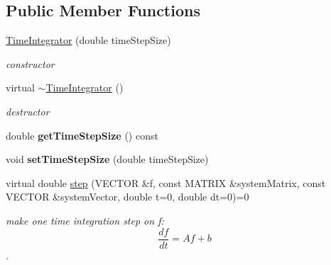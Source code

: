 \subsection*{Public Member Functions}
\begin{DoxyCompactItemize}
\item 
\hypertarget{classnatrium_1_1TimeIntegrator_a420ea9baabf0839bc8ecb5f5e02ce95b}{
\hyperlink{classnatrium_1_1TimeIntegrator_a420ea9baabf0839bc8ecb5f5e02ce95b}{TimeIntegrator} (double timeStepSize)}
\label{classnatrium_1_1TimeIntegrator_a420ea9baabf0839bc8ecb5f5e02ce95b}

\begin{DoxyCompactList}\small\item\em constructor \item\end{DoxyCompactList}\item 
\hypertarget{classnatrium_1_1TimeIntegrator_a8795d06c5322b72a5a2a1f30aa7a051d}{
virtual \hyperlink{classnatrium_1_1TimeIntegrator_a8795d06c5322b72a5a2a1f30aa7a051d}{$\sim$TimeIntegrator} ()}
\label{classnatrium_1_1TimeIntegrator_a8795d06c5322b72a5a2a1f30aa7a051d}

\begin{DoxyCompactList}\small\item\em destructor \item\end{DoxyCompactList}\item 
\hypertarget{classnatrium_1_1TimeIntegrator_a6e763133e114cdd758307ca30b65f161}{
double {\bfseries getTimeStepSize} () const }
\label{classnatrium_1_1TimeIntegrator_a6e763133e114cdd758307ca30b65f161}

\item 
\hypertarget{classnatrium_1_1TimeIntegrator_a18592866e946c63ab1595d3ab688ea6b}{
void {\bfseries setTimeStepSize} (double timeStepSize)}
\label{classnatrium_1_1TimeIntegrator_a18592866e946c63ab1595d3ab688ea6b}

\item 
virtual double \hyperlink{classnatrium_1_1TimeIntegrator_a1c438e41d183d172d524aa5dc97785fb}{step} (VECTOR \&f, const MATRIX \&systemMatrix, const VECTOR \&systemVector, double t=0, double dt=0)=0
\begin{DoxyCompactList}\small\item\em make one time integration step on f: \[ \frac{df}{dt} = Af+b \]. \item\end{DoxyCompactList}\end{DoxyCompactItemize}


